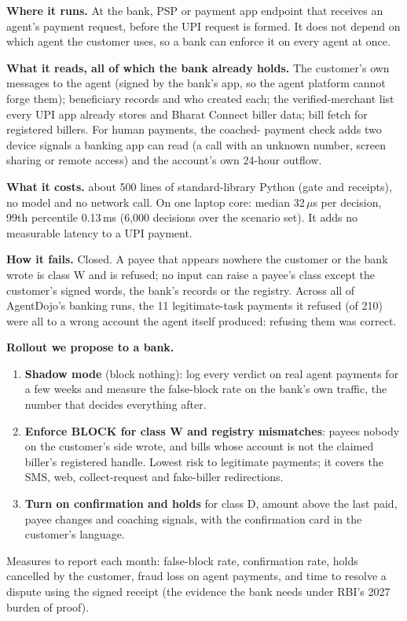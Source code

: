\documentclass[10pt,a4paper]{article}
\begin{document}
\textbf{Where it runs.} At the bank, PSP or payment app endpoint that receives an agent's payment request, before the UPI
request is formed. It does not depend on which agent the customer uses, so a bank can enforce it on every agent at once.

\textbf{What it reads, all of which the bank already holds.} The customer's own messages to the agent (signed by the bank's
app, so the agent platform cannot forge them); beneficiary records and who created each; the verified-merchant list every
UPI app already stores and Bharat Connect biller data; bill fetch for registered billers. For human payments, the coached-
payment check adds two device signals a banking app can read (a call with an unknown number, screen sharing or remote
access) and the account's own 24-hour outflow.

\textbf{What it costs.} about 500 lines of standard-library Python (gate and receipts), no model and no network call. On one
laptop core: median 32\,$\mu$s per decision, 99th percentile 0.13\,ms (6,000 decisions over the scenario set). It adds
no measurable latency to a UPI payment.

\textbf{How it fails.} Closed. A payee that appears nowhere the customer or the bank wrote is class W and is refused; no
input can raise a payee's class except the customer's signed words, the bank's records or the registry. Across all of
AgentDojo's banking runs, the 11 legitimate-task payments it refused (of 210) were all to a wrong account the agent itself
produced: refusing them was correct.

\textbf{Rollout we propose to a bank.}
\begin{enumerate}
\item \textbf{Shadow mode} (block nothing): log every verdict on real agent payments for a few weeks and measure the
false-block rate on the bank's own traffic, the number that decides everything after.
\item \textbf{Enforce BLOCK for class W and registry mismatches}: payees nobody on the customer's side wrote, and bills
whose account is not the claimed biller's registered handle. Lowest risk to legitimate payments; it covers the SMS, web,
collect-request and fake-biller redirections.
\item \textbf{Turn on confirmation and holds} for class D, amount above the last paid, payee changes and coaching signals,
with the confirmation card in the customer's language.
\end{enumerate}
Measures to report each month: false-block rate, confirmation rate, holds cancelled by the customer, fraud loss on agent
payments, and time to resolve a dispute using the signed receipt (the evidence the bank needs under RBI's 2027 burden of
proof).
\end{document}
